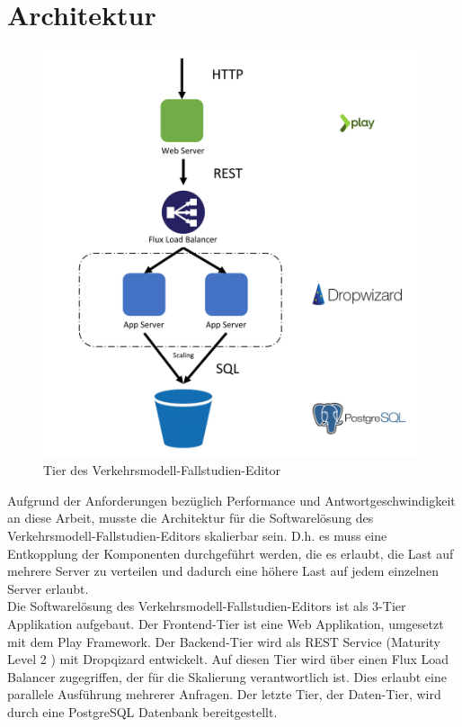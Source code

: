 \section{Architektur}
\begin{figure}[H]
\centering
\includegraphics[height=12cm]{images/Architektur.png}
\caption{Tier des Verkehrsmodell-Fallstudien-Editor}
\label{tier_architecture}
\end{figure}
Aufgrund der Anforderungen bezüglich Performance und Antwortgeschwindigkeit an diese Arbeit, musste die Architektur für die Softwarelösung des Verkehrsmodell-Fallstudien-Editors skalierbar sein. D.h. es muss eine Entkopplung der Komponenten durchgeführt werden, die es erlaubt, die Last auf mehrere Server zu verteilen und dadurch eine höhere Last auf jedem einzelnen Server erlaubt.\\
Die Softwarelösung des Verkehrsmodell-Fallstudien-Editors ist als 3-Tier Applikation aufgebaut. Der Frontend-Tier ist eine Web Applikation, umgesetzt mit dem Play Framework. Der Backend-Tier wird als REST Service (Maturity Level 2 \cite{RESTMaturity}) mit Dropqizard entwickelt. Auf diesen Tier wird über einen Flux Load Balancer zugegriffen, der für die Skalierung verantwortlich ist. Dies erlaubt eine parallele Ausführung mehrerer Anfragen. Der letzte Tier, der Daten-Tier, wird durch eine PostgreSQL Datenbank bereitgestellt.
